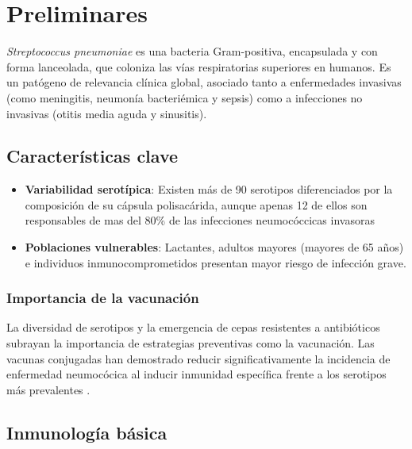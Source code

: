 \chapter{Preliminares}\label{chapter:preliminares}


\textit{Streptococcus pneumoniae} es una bacteria Gram-positiva, encapsulada y con forma lanceolada, que coloniza las vías respiratorias superiores en humanos. Es un patógeno de relevancia clínica global, asociado tanto a enfermedades invasivas (como meningitis, neumonía bacteriémica y sepsis) como a infecciones no invasivas (otitis media aguda y sinusitis).



\section{Características clave}
\begin{itemize}
    \item \textbf{Variabilidad serotípica}: Existen más de 90 serotipos diferenciados por la composición de su cápsula polisacárida, aunque apenas 12 de ellos son responsables de mas del 80\% de las infecciones neumocóccicas invasoras \cite{PREADOJ2001}
    \item \textbf{Poblaciones vulnerables}: Lactantes, adultos mayores (mayores de 65 años) e individuos inmunocomprometidos presentan mayor riesgo de infección grave.
\end{itemize}

\subsection{Importancia de la vacunación}
La diversidad de serotipos y la emergencia de cepas resistentes a antibióticos subrayan la importancia de estrategias preventivas como la vacunación. Las vacunas conjugadas han demostrado reducir significativamente la incidencia de enfermedad neumocócica al inducir inmunidad específica frente a los serotipos más prevalentes \cite{Snedecor2020a}.

\section{Inmunología básica}

